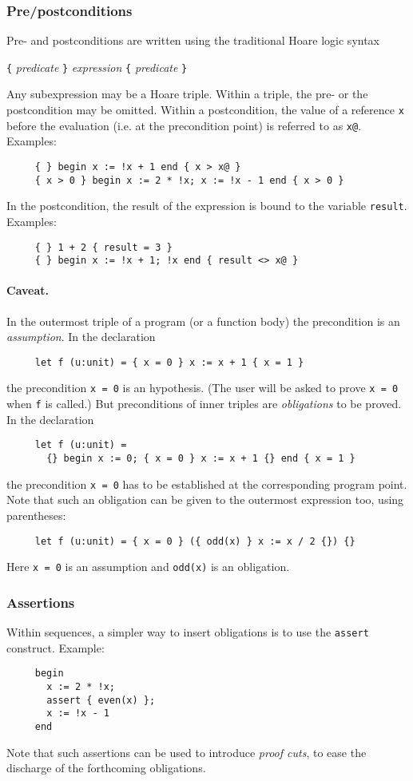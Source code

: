 \documentclass[a4paper,12pt]{report}
\makeatletter
\newcommand{\indextt}[1]{\index{#1@\texttt{#1}}}
\newcommand{\caveat}{\paragraph{Caveat.}}
\makeatother
\begin{document}
\subsubsection{Pre/postconditions}
Pre- and postconditions are written using the traditional Hoare logic
syntax 
\begin{center}
  \texttt{\{} \textsl{predicate} \texttt{\}} 
  \textsl{expression}
  \texttt{\{} \textsl{predicate} \texttt{\}} 
\end{center}
Any subexpression may be a Hoare triple. Within a triple, the pre- or
the postcondition may be omitted.
Within a postcondition, the value of a reference \texttt{x} before the
evaluation (i.e. at the precondition point) is referred to as \texttt{x@}.
Examples:
\begin{verbatim}
     { } begin x := !x + 1 end { x > x@ }
     { x > 0 } begin x := 2 * !x; x := !x - 1 end { x > 0 }
\end{verbatim}
In the postcondition, the result of the expression is bound to the
variable \texttt{result}. \indextt{result} 
Examples:
\begin{verbatim}
     { } 1 + 2 { result = 3 }
     { } begin x := !x + 1; !x end { result <> x@ }
\end{verbatim}


\caveat
In the outermost triple of a program (or a function body) the
precondition is an \emph{assumption}. In the declaration
\begin{verbatim}
     let f (u:unit) = { x = 0 } x := x + 1 { x = 1 }
\end{verbatim}
the precondition \texttt{x = 0} is an hypothesis. (The user will be
asked to prove \texttt{x = 0} when \texttt{f} is called.)
But preconditions of inner triples are \emph{obligations} to be
proved. In the declaration 
\begin{verbatim}
     let f (u:unit) = 
       {} begin x := 0; { x = 0 } x := x + 1 {} end { x = 1 }
\end{verbatim}
the precondition \texttt{x = 0} has to be established at the
corresponding program point.
Note that such an obligation can be given to the outermost expression
too, using parentheses:
\begin{verbatim}
     let f (u:unit) = { x = 0 } ({ odd(x) } x := x / 2 {}) {}
\end{verbatim}
Here \texttt{x = 0} is an assumption and \texttt{odd(x)} is an obligation.


\subsubsection{Assertions}
\indextt{assert}
Within sequences, a simpler way to insert obligations is to use the
\texttt{assert} construct. Example:
\begin{verbatim}
     begin 
       x := 2 * !x;
       assert { even(x) };
       x := !x - 1
     end
\end{verbatim}
Note that such assertions can be used to introduce \emph{proof cuts},
to ease the discharge of the forthcoming obligations.
\end{document}
